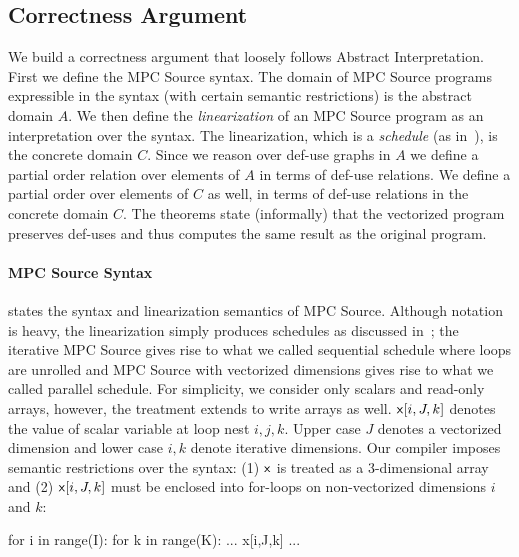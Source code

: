 \subsection{Correctness Argument}
\label{sec:correctness}


We build a correctness argument that loosely follows Abstract Interpretation.
First we define the MPC Source syntax. The domain of MPC Source programs
expressible in the syntax (with certain semantic restrictions) is the abstract domain $A$.
We then define the \emph{linearization} of an MPC Source program as an interpretation
over the syntax. The linearization, which is a \emph{schedule} (as in~), is the concrete domain $C$.
Since we reason over def-use graphs in $A$ we define a partial order relation over elements of $A$
in terms of def-use relations. We define a partial order over elements of $C$ as well,
in terms of def-use relations in the concrete domain $C$. The theorems state 
(informally) that the vectorized program preserves def-uses and thus computes the same 
result as the original program. 

\squeeze
\paragraph{MPC Source Syntax}

 states the syntax and linearization semantics of MPC Source. 
Although notation is heavy, the linearization simply produces schedules as discussed in~; 
the iterative MPC Source gives rise to what we called sequential schedule where loops are unrolled 
and MPC Source with vectorized dimensions gives rise to what we called parallel schedule. 
For simplicity, we consider only scalars and read-only arrays, however, the treatment extends to write arrays as well.
${\sf {x}}[i,J,k]$ denotes the value of scalar variable \x{} at loop nest $i,j,k$. 
Upper case $J$ denotes a vectorized dimension and lower case $i,k$ denote iterative dimensions. Our compiler imposes 
semantic restrictions over the syntax: (1) ${\sf {x}}$ is treated as a 3-dimensional array and (2) ${\sf {x}}[i,J,k]$ must be enclosed
into for-loops on non-vectorized dimensions $i$ and $k$:
\begin{pythonn}
for i in range(I):
   for k in range(K):
      ... x[i,J,k] ...
\end{pythonn}


